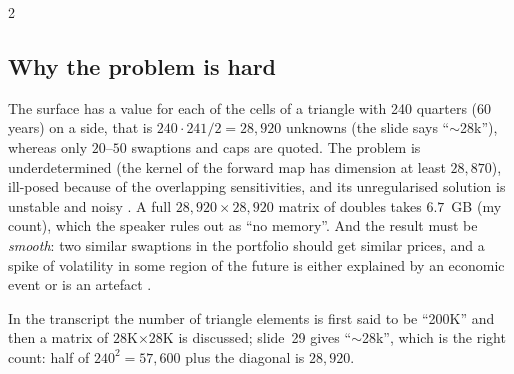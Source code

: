 \begin{paracol}{2}
\subsection{Why the problem is hard}\label{ch20:sec-volhard}
The surface has a value for each of the cells of a triangle with 240 quarters (60 years) on a side, that is $240\cdot241/2=28{,}920$ unknowns  (the slide says ``$\sim$28k''), whereas only $20$--$50$ swaptions and caps are quoted. The problem is underdetermined
(the kernel of the forward map has dimension at least $28{,}870$), ill-posed because of the overlapping sensitivities, and its unregularised solution is unstable and noisy . A full $28{,}920\times28{,}920$ matrix of doubles takes $6.7$~GB (my count),
which the speaker rules out as ``no memory''. And the result must be \emph{smooth}: two similar swaptions in the portfolio should get similar prices, and a spike of volatility in some region of the future is either explained by an economic event or is an artefact
.

\begin{coursenote}
In the transcript  the number of triangle elements is first said to be ``200K'' and then a matrix of $28$K$\times28$K is discussed; slide~29 gives ``$\sim$28k'', which is the right count: half of $240^2=57{,}600$ plus the diagonal is $28{,}920$.
\end{coursenote}


\end{paracol}
